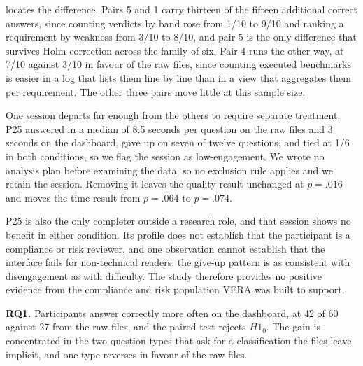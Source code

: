 \documentclass[10pt,conference]{IEEEtran}
\providecommand{\rqbox}[2]{%
  \begin{tcolorbox}[
    colback=green!10,
    colframe=rqgreen,
    arc=1mm,
    boxrule=0.5pt,
    left=1mm,
    right=1mm,
    top=0.5mm,
    bottom=0.5mm,
    before skip=4pt,
    after skip=4pt
  ]
  \textbf{#1.} #2
  \end{tcolorbox}%
}
\begin{document}
 locates the difference.
Pairs 5 and 1 carry thirteen of the fifteen additional correct answers, since counting verdicts by band rose from 1/10 to 9/10 and ranking a requirement by weakness from 3/10 to 8/10, and pair 5 is the only difference that survives Holm correction across the family of six.
Pair 4 runs the other way, at 7/10 against 3/10 in favour of the raw files, since counting executed benchmarks is easier in a log that lists them line by line than in a view that aggregates them per requirement.
The other three pairs move little at this sample size.

One session departs far enough from the others to require separate treatment.
P25 answered in a median of 8.5 seconds per question on the raw files and 3 seconds on the dashboard, gave up on seven of twelve questions, and tied at 1/6 in both conditions, so we flag the session as low-engagement.
We wrote no analysis plan before examining the data, so no exclusion rule applies and we retain the session.
Removing it leaves the quality result unchanged at $p = .016$ and moves the time result from $p = .064$ to $p = .074$.

P25 is also the only completer outside a research role, and that session shows no benefit in either condition.
Its profile does not establish that the participant is a compliance or risk reviewer, and one observation cannot establish that the interface fails for non-technical readers; the give-up pattern is as consistent with disengagement as with difficulty.
The study therefore provides no positive evidence from the compliance and risk population VERA was built to support.

\rqbox{RQ1}{Participants answer correctly more often on the dashboard, at 42 of 60 against 27 from the raw files, and the paired test rejects $H1_0$. The gain is concentrated in the two question types that ask for a classification the files leave implicit, and one type reverses in favour of the raw files.}
\end{document}
